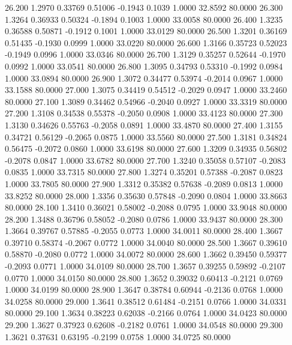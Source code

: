   26.200   1.2970   0.33769   0.51006  -0.1943   0.1039   1.0000  32.8592  80.0000
  26.300   1.3264   0.36933   0.50324  -0.1894   0.1003   1.0000  33.0058  80.0000
  26.400   1.3235   0.36588   0.50871  -0.1912   0.1001   1.0000  33.0129  80.0000
  26.500   1.3201   0.36169   0.51435  -0.1930   0.0999   1.0000  33.0220  80.0000
  26.600   1.3166   0.35723   0.52023  -0.1949   0.0996   1.0000  33.0346  80.0000
  26.700   1.3129   0.35257   0.52644  -0.1970   0.0992   1.0000  33.0541  80.0000
  26.800   1.3095   0.34793   0.53310  -0.1992   0.0984   1.0000  33.0894  80.0000
  26.900   1.3072   0.34477   0.53974  -0.2014   0.0967   1.0000  33.1588  80.0000
  27.000   1.3075   0.34419   0.54512  -0.2029   0.0947   1.0000  33.2460  80.0000
  27.100   1.3089   0.34462   0.54966  -0.2040   0.0927   1.0000  33.3319  80.0000
  27.200   1.3108   0.34538   0.55378  -0.2050   0.0908   1.0000  33.4123  80.0000
  27.300   1.3130   0.34626   0.55763  -0.2058   0.0891   1.0000  33.4870  80.0000
  27.400   1.3155   0.34721   0.56129  -0.2065   0.0875   1.0000  33.5560  80.0000
  27.500   1.3181   0.34824   0.56475  -0.2072   0.0860   1.0000  33.6198  80.0000
  27.600   1.3209   0.34935   0.56802  -0.2078   0.0847   1.0000  33.6782  80.0000
  27.700   1.3240   0.35058   0.57107  -0.2083   0.0835   1.0000  33.7315  80.0000
  27.800   1.3274   0.35201   0.57388  -0.2087   0.0823   1.0000  33.7805  80.0000
  27.900   1.3312   0.35382   0.57638  -0.2089   0.0813   1.0000  33.8252  80.0000
  28.000   1.3356   0.35630   0.57848  -0.2090   0.0804   1.0000  33.8663  80.0000
  28.100   1.3410   0.36021   0.58002  -0.2088   0.0795   1.0000  33.9048  80.0000
  28.200   1.3488   0.36796   0.58052  -0.2080   0.0786   1.0000  33.9437  80.0000
  28.300   1.3664   0.39767   0.57885  -0.2055   0.0773   1.0000  34.0011  80.0000
  28.400   1.3667   0.39710   0.58374  -0.2067   0.0772   1.0000  34.0040  80.0000
  28.500   1.3667   0.39610   0.58870  -0.2080   0.0772   1.0000  34.0072  80.0000
  28.600   1.3662   0.39450   0.59377  -0.2093   0.0771   1.0000  34.0109  80.0000
  28.700   1.3657   0.39255   0.59892  -0.2107   0.0770   1.0000  34.0150  80.0000
  28.800   1.3652   0.39032   0.60413  -0.2121   0.0769   1.0000  34.0199  80.0000
  28.900   1.3647   0.38784   0.60944  -0.2136   0.0768   1.0000  34.0258  80.0000
  29.000   1.3641   0.38512   0.61484  -0.2151   0.0766   1.0000  34.0331  80.0000
  29.100   1.3634   0.38223   0.62038  -0.2166   0.0764   1.0000  34.0423  80.0000
  29.200   1.3627   0.37923   0.62608  -0.2182   0.0761   1.0000  34.0548  80.0000
  29.300   1.3621   0.37631   0.63195  -0.2199   0.0758   1.0000  34.0725  80.0000
